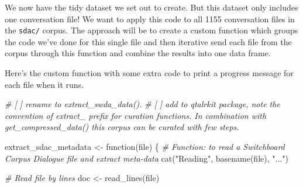 \documentclass[
  letterpaper,
  DIV=11,
  numbers=noendperiod]{scrreport}
\newenvironment{Shaded}{\begin{snugshade}}{\end{snugshade}}
\newcommand{\CommentTok}[1]{\textcolor[rgb]{0.00,0.00,0.00}{\textit{#1}}}
\newcommand{\ControlFlowTok}[1]{\textcolor[rgb]{0.00,0.00,0.00}{#1}}
\newcommand{\FunctionTok}[1]{\textcolor[rgb]{0.00,0.00,0.00}{#1}}
\newcommand{\NormalTok}[1]{\textcolor[rgb]{0.00,0.00,0.00}{#1}}
\newcommand{\OtherTok}[1]{\textcolor[rgb]{0.00,0.00,0.00}{#1}}
\newcommand{\StringTok}[1]{\textcolor[rgb]{0.00,0.00,0.00}{#1}}
\theoremstyle{definition}
\theoremstyle{remark}
\begin{document}
We now have the tidy dataset we set out to create. But this dataset only
includes one conversation file! We want to apply this code to all 1155
conversation files in the \texttt{sdac/} corpus. The approach will be to
create a custom function which groups the code we've done for this
single file and then iterative send each file from the corpus through
this function and combine the results into one data frame.

Here's the custom function with some extra code to print a progress
message for each file when it runs.

\begin{Shaded}
\begin{Highlighting}[]
\CommentTok{\# [ ] rename to \textasciigrave{}extract\_swda\_data()\textasciigrave{}.}
\CommentTok{\# [ ] add to \textasciigrave{}qtalrkit\textasciigrave{} package, note the convention of \textasciigrave{}extract\_\textasciigrave{} prefix for curation functions. In combination with \textasciigrave{}get\_compressed\_data()\textasciigrave{} this corpus can be curated with few steps.}

\NormalTok{extract\_sdac\_metadata }\OtherTok{\textless{}{-}} \ControlFlowTok{function}\NormalTok{(file) \{}
  \CommentTok{\# Function: to read a Switchboard Corpus Dialogue file and extract meta{-}data}
  \FunctionTok{cat}\NormalTok{(}\StringTok{"Reading"}\NormalTok{, }\FunctionTok{basename}\NormalTok{(file), }\StringTok{"..."}\NormalTok{)}
  
  \CommentTok{\# Read \textasciigrave{}file\textasciigrave{} by lines}
\NormalTok{  doc }\OtherTok{\textless{}{-}} \FunctionTok{read\_lines}\NormalTok{(file) }
  

\end{Highlighting}
\end{Shaded}
\end{document}
